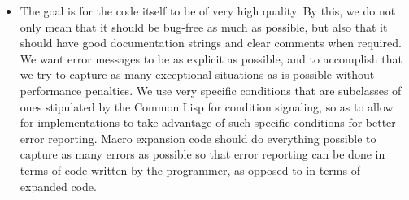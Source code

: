 \begin{itemize}
\item The goal is for the code itself to be of very high quality.
  By this, we do not only mean that it should be bug-free as much as
  possible, but also that it should have good documentation strings
  and clear comments when required.  We want error messages to be as
  explicit as possible, and to accomplish that we try to capture as
  many exceptional situations as is possible without performance
  penalties.  We use very specific conditions that are subclasses of
  ones stipulated by the Common Lisp \hs{} for condition
  signaling, so as to allow for implementations to take advantage of
  such specific conditions for better error reporting.  Macro
  expansion code should do everything possible to capture as many
  errors as possible so that error reporting can be done in terms of
  code written by the programmer, as opposed to in terms of expanded
  code.

\end{itemize}

